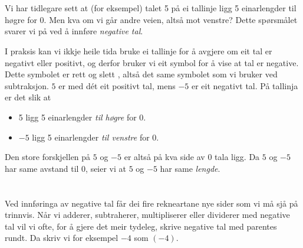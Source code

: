 




\section{\negintro}
Vi har tidlegare sett at (for eksempel) talet 5 på ei tallinje ligg 5 einarlengder til høgre for 0. 
Men kva om vi går andre veien, altså mot venstre? Dette spørsmålet svarer vi på ved å innføre \textit{negative tal}.\regv

\vsk 
I praksis kan vi ikkje heile tida bruke ei tallinje for å avgjere om eit tal er negativt eller positivt, og derfor bruker vi eit symbol for å vise at tal er negative. Dette symbolet er rett og slett \sym{$ - $}, altså det same symbolet som vi bruker ved subtraksjon. $ 5 $ er med dét eit positivt tal, mens $ -5 $ er eit negativt tal. På tallinja er det slik at
\begin{itemize}
	\item 5 ligg 5 einarlengder \textsl{til høgre} for 0.
	\item $ -5 $ ligg 5 einarlengder \textsl{til venstre} for 0.
\end{itemize}
Den store forskjellen på $ 5 $ og $ -5 $ er altså på kva side av 0 tala ligg. Da $ 5 $ og $ -5 $ har same avstand til 0, seier vi at $ 5 $ og $ -5 $ har same \textit{lengde}. \regv

\eks[1]{ \vs \vs
\[ |27|=27 \]
}
\eks[2]{ \vs \vs
\[ |-27|=27 \]
}
\newpage
\section{\negrekn \label{rekmneg}}
Ved innføringa av negative tal får dei fire rekneartane nye sider som vi må sjå på trinnvis. Når vi adderer, subtraherer, multipliserer eller dividerer med negative tal vil vi ofte, for å gjere det meir tydeleg, skrive negative tal med parentes rundt. Da skriv vi for eksempel $ -4 $ som $ (-4) $. 

